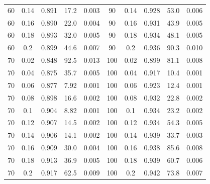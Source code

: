 \documentclass[12pt]{article}
\begin{document}
\begin{spacing}{2.0}
\begin{table}[h!]
\begin{tabular}{c c | c | c c ||c c | c | c c |}
                60&0.14&0.891&17.2&0.003	&	90&0.14&0.928&53.0&0.006\\
                60&0.16&0.890&22.0&0.004	&	90&0.16&0.931&43.9&0.005\\
                60&0.18&0.893&32.0&0.005	&	90&0.18&0.934&48.1&0.005\\
                60&0.2&0.899&44.6&0.007	&	90&0.2&0.936&90.3&0.010\\
                70&0.02&0.848&92.5&0.013	&	100&0.02&0.899&81.1&0.008\\
                70&0.04&0.875&35.7&0.005	&	100&0.04&0.917&10.4&0.001\\
                70&0.06&0.877&7.92&0.001	&	100&0.06&0.923&12.4&0.001\\
                70&0.08&0.898&16.6&0.002	&	100&0.08&0.932&22.8&0.002\\
                70&0.1&0.904&8.82&0.001	&	100&0.1&0.934&23.2&0.002\\
                70&0.12&0.907&14.5&0.002	&	100&0.12&0.934&54.3&0.005\\
                70&0.14&0.906&14.1&0.002	&	100&0.14&0.939&33.7&0.003\\
                70&0.16&0.909&30.0&0.004	&	100&0.16&0.938&85.6&0.008\\
                70&0.18&0.913&36.9&0.005	&	100&0.18&0.939&60.7&0.006\\
                70&0.2&0.917&62.5&0.009	&	100&0.2&0.942&73.8&0.007\\
				\hline
			\end{tabular}
			\end{table}


\end{spacing}
\end{document}
